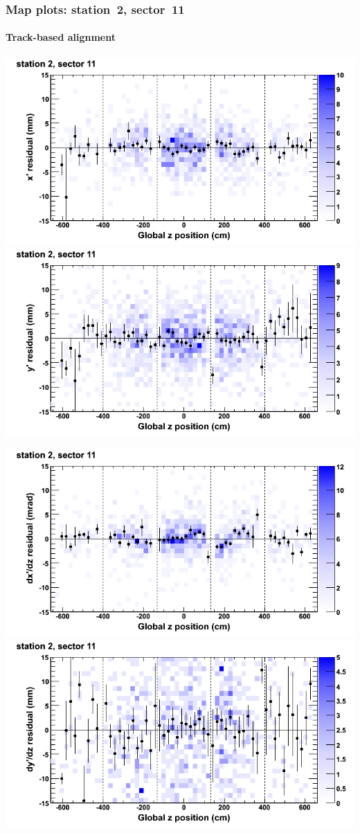 \documentclass[compress]{beamer}
\begin{document}
\begin{frame}
\frametitle{Map plots: station~2, sector~11}
\framesubtitle{Track-based alignment}
\includegraphics[width=0.5\linewidth]{mapplots_re05/DTvsz_st2sec11_x.png}
\includegraphics[width=0.5\linewidth]{mapplots_re05/DTvsz_st2sec11_y.png}

\includegraphics[width=0.5\linewidth]{mapplots_re05/DTvsz_st2sec11_dxdz.png}
\includegraphics[width=0.5\linewidth]{mapplots_re05/DTvsz_st2sec11_dydz.png}
\end{frame}
\end{document}
